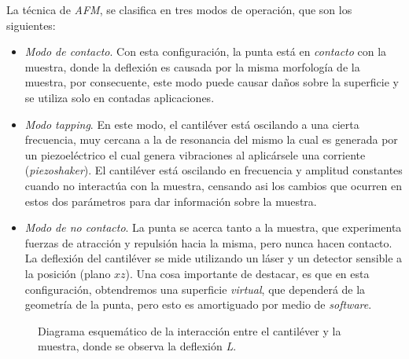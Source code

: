 La técnica de \textit{AFM}, se clasifica en tres modos de operación, que son los siguientes:
 \begin{itemize}
    \item \textit{Modo de contacto}. Con esta configuración, la punta está en \textit{contacto} con la muestra, donde la deflexión es causada por la misma morfología de la muestra, por consecuente, este modo puede causar daños sobre la superficie y se utiliza solo en contadas aplicaciones.
    
    \item \textit{Modo tapping}. En este modo, el cantiléver está oscilando a una cierta frecuencia, muy cercana a la de resonancia del mismo la cual es generada por un piezoeléctrico el cual genera vibraciones al aplicársele una corriente (\textit{piezoshaker}). El cantiléver está oscilando en frecuencia y amplitud constantes cuando no interactúa con la muestra, censando asi los cambios que ocurren en estos dos parámetros para dar información sobre la muestra\cite{Reifenberger2015-bh}.
   
    \item \textit{Modo de no contacto}. La punta se acerca tanto a la muestra, que experimenta fuerzas de atracción y repulsión hacia la misma, pero nunca hacen contacto. La deflexión del cantiléver se mide utilizando un láser y un detector sensible a la posición (plano $xz$). Una cosa importante de destacar, es que en esta configuración, obtendremos una superficie \textit{virtual}, que dependerá de la geometría de la punta, pero esto es amortiguado por medio de \textit{software}.
 \end{itemize}

 \begin{figure}[H]
    \centering
        \caption{Diagrama esquemático de la interacción entre el cantiléver y la muestra, donde se observa la deflexión \textit{L}.}
    \label{fig:afm_diagram}
\end{figure}

